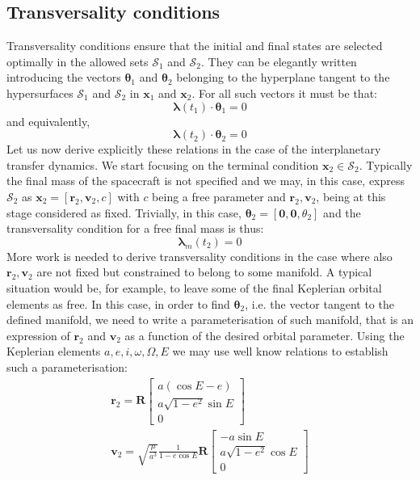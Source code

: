 \documentclass[graybox]{svmult}
\begin{document}
\subsection {Transversality conditions}
Transversality conditions ensure that the initial and final states are selected optimally in the allowed sets $\mathcal S_1$ and $\mathcal S_2$. They can be elegantly written introducing the vectors $\boldsymbol \theta_1$ and $\boldsymbol \theta_2$ belonging to the hyperplane tangent to the hypersurfaces $\mathcal S_1$ and $\mathcal S_2$ in $\mathbf x_1$ and $\mathbf x_2$. For all such vectors it must be that:
$$
\boldsymbol \lambda(t_1) \cdot \boldsymbol \theta_1 = 0
$$
and equivalently,
$$
\boldsymbol \lambda(t_2) \cdot \boldsymbol \theta_2 = 0
$$
Let us now derive explicitly these relations in the case of the interplanetary transfer dynamics. We start focusing on the terminal condition $\mathbf x_2 \in \mathcal S_2$. Typically the final mass of the spacecraft is not specified and we may, in this case, express $\mathcal S_2$ as $\mathbf x_2 = [\mathbf r_2, \mathbf v_2, c]$ with $c$ being a free parameter and $\mathbf r_2, \mathbf v_2$, being at this stage considered as fixed. Trivially, in this case, $\boldsymbol \theta_2 = [\mathbf 0,\mathbf 0,\theta_2]$ and the transversality condition for a free final mass is thus:
\begin{equation}\label{eq:transversality_mass}
\boldsymbol \lambda_m(t_2) = 0
\end{equation}
More work is needed to derive transversality conditions in the case where also $\mathbf r_2, \mathbf v_2$ are not fixed but constrained to belong to some manifold. A typical situation would be, for example, to leave some of the final Keplerian orbital elements as free. In this case, in order to find 
$\boldsymbol \theta_2$, i.e. the vector tangent to the defined manifold, we need to write a parameterisation of such manifold, that is an expression of  $\mathbf r_2$ and  $\mathbf v_2$ as a function of the desired orbital parameter. Using the Keplerian elements $a,e,i,\omega,\Omega, E$ we may use well know relations to establish such a parameterisation:
\begin{equation}\label{eq:parametrization}
\begin{array}{l}
\mathbf r_2 = \mathbf R \left[\begin{array}{c}
    a(\cos E - e)   \\
    a\sqrt{1-e^2}\sin E \\
    0
\end{array}\right]\\
\mathbf v_2 = \sqrt{\frac{\mu}{a^3}}\frac{1}{1-e\cos E}\mathbf R \left[\begin{array}{c}
    - a\sin E   \\
    a\sqrt{1-e^2}\cos E \\
    0
\end{array}\right]
\end{array}
\end{equation}
\end{document}
